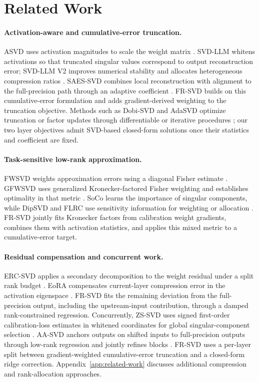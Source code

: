\documentclass[11pt]{article}
\begin{document}
\section{Related Work}\label{sec:related-work}

\paragraph{Activation-aware and cumulative-error truncation.}
ASVD uses activation magnitudes to scale the weight matrix \citep{yuan2023asvd}. SVD-LLM whitens activations so that truncated singular values correspond to output reconstruction error; SVD-LLM V2 improves numerical stability and allocates heterogeneous compression ratios \citep{wang2025svdllm,wang2025svdllmv2}. SAES-SVD combines local reconstruction with alignment to the full-precision path through an adaptive coefficient \citep{hu2026saessvd}. FR-SVD builds on this cumulative-error formulation and adds gradient-derived weighting to the truncation objective. Methods such as Dobi-SVD and AdaSVD optimize truncation or factor updates through differentiable or iterative procedures \citep{wang2025dobisvd,li2025adasvd}; our two layer objectives admit SVD-based closed-form solutions once their statistics and coefficient are fixed.

\paragraph{Task-sensitive low-rank approximation.}
FWSVD weights approximation errors using a diagonal Fisher estimate \citep{hsu2022fwsvd}. GFWSVD uses generalized Kronecker-factored Fisher weighting and establishes optimality in that metric \citep{chekalina2025gfwsvd}. SoCo learns the importance of singular components, while DipSVD and FLRC use sensitivity information for weighting or allocation \citep{li2025soco,ding2025dipsvd,lu2025flrc}. FR-SVD jointly fits Kronecker factors from calibration weight gradients, combines them with activation statistics, and applies this mixed metric to a cumulative-error target.

\paragraph{Residual compensation and concurrent work.}
ERC-SVD applies a secondary decomposition to the weight residual under a split rank budget \citep{bai2025ercsvd}. EoRA compensates current-layer compression error in the activation eigenspace \citep{liu2025eora}. FR-SVD fits the remaining deviation from the full-precision output, including the upstream-input contribution, through a damped rank-constrained regression. Concurrently, ZS-SVD uses signed first-order calibration-loss estimates in whitened coordinates for global singular-component selection \citep{abbasi2026zssvd}. AA-SVD anchors outputs on shifted inputs to full-precision outputs through low-rank regression and jointly refines blocks \citep{sinha2026aasvd}. FR-SVD uses a per-layer split between gradient-weighted cumulative-error truncation and a closed-form ridge correction. Appendix~\ref{app:related-work} discusses additional compression and rank-allocation approaches.
\end{document}
